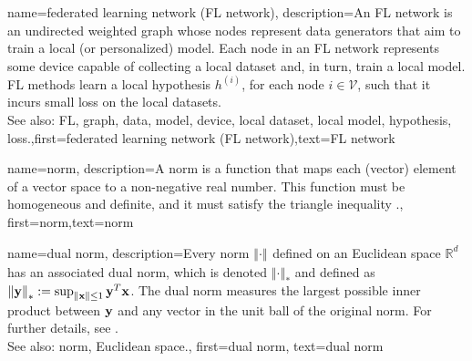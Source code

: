 {name={federated learning network (FL network)},
	description={An FL network is an 
		undirected weighted graph whose nodes represent data generators that 
		aim to train a local (or personalized) model. Each node in an FL network 
		represents some device capable of collecting a local dataset 
		and, in turn, train a local model. FL methods learn a local hypothesis $h^{(i)}$, for 
	    each node $i \in \mathcal{V}$, such that it incurs small loss on the local datasets.
	    			\\ 
		See also: FL, graph, data, model, device, local dataset, local model, hypothesis, loss.},first={federated learning network (FL network)},text={FL network} 
}

{name={norm},
	description={A norm is a function that maps each (vector) element 
		of a vector space to a non-negative real number. This function must be 
		homogeneous and definite, and it must satisfy the triangle inequality \cite{HornMatAnalysis}.},
	first={norm},text={norm} 
}

{name={dual norm},
description={Every norm $\left\Vert  {\cdot} \right\Vert_{}$ defined on an Euclidean space $\mathbb{R}^{d}$ 
		has an associated dual norm, which is denoted $\left\Vert  {\cdot} \right\Vert_{*}$ and defined as 
		$\left\Vert  {{\bf y}} \right\Vert_{*} := \sup_{\Vert  {{\bf x}} \Vert{} \le 1} {\bf y}^{T} {\bf x}$. 
		The dual norm measures the largest possible inner product between ${\bf y}$ 
		and any vector in the unit ball of the original norm. For further details, see 
		\cite[Sec.~A.1.6]{BoydConvexBook}.
					\\ 
		See also: norm, Euclidean space.},
	first={dual norm},
	text={dual norm}
}

